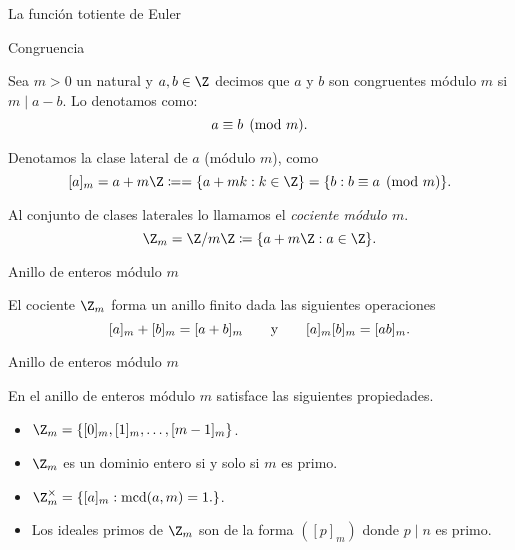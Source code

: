 \begin{frame}
  \begin{center}\fontsize{20}{24}\selectfont
    La función totiente de Euler
  \end{center}
\end{frame}

\begin{frame}{Congruencia}
  \begin{definition}
    Sea $m>0$ un natural y $a,b \in \Z$ decimos que $a$ y $b$ son congruentes módulo $m$ si $m \mid a-b$. Lo denotamos como:
    \[
        a \equiv b \pmod{m}.
    \]
\end{definition}
\end{frame}

\begin{frame}
\begin{definition}
  Denotamos la clase lateral de $a$ (módulo $m$), como
  \[
    [a]_m = a + m\Z \coloneqq = \{ a + mk : k \in \Z\}
      = \{ b : b\eqv a \pmod{m} \}.
  \]
  
  \pause

  Al conjunto de clases laterales lo llamamos el \emph{cociente módulo $m$}.
  \[
      \Z_m = \Z/m\Z \coloneqq  \{ a + m\Z : a \in \Z\}.
  \]

\end{definition}
\end{frame}

\begin{frame}{Anillo de enteros módulo $m$}
  \begin{proposition}
    El cociente $\Z_m$ forma un anillo finito dada las siguientes operaciones
    \[
        [a]_m + [b]_m = [a+b]_m
            \qquad\text{y}\qquad
        [a]_m [b]_m = [ab]_m.
    \]
\end{proposition}
\end{frame}


\begin{frame}{Anillo de enteros módulo $m$}
  \begin{proposition}
    En el anillo de enteros módulo $m$ satisface las siguientes propiedades.
    \pause
    \begin{itemize}[<+->]
        \item $\Z_m =  \{ [0]_m, [1]_m, \ldots, [m-1]_m \}$.
        \bigskip
        
        \item $\Z_m$ es un dominio entero si y solo si $m$ es primo.
        \bigskip
        
        \item $\Z_m^\times = \{ [a]_m : \mcd(a,m)=1. \} $. 
        \bigskip
        
        \item Los ideales primos de $\Z_m$ son de la forma $([p]_m)$ donde $p \mid n$ es primo. 
    \end{itemize}
\end{proposition}
\end{frame}


